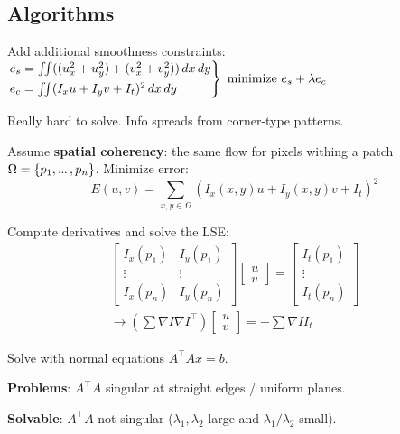 \subsection{Algorithms}

\begin{algorithm}
  Add additional smoothness constraints:
  \(\begin{rcases*}
    e_s = \iint ((u_x^2 + u_y^2) + (v_x^2 + v_y^2)) \,dx \,dy \\
    e_c = \iint (I_x u + I_yv +I_t)^2 \,dx \,dy
  \end{rcases*} \ \text{minimize} \ e_s + \lambda e_c \)

  Really hard to solve. Info spreads from corner-type patterns.
\end{algorithm}

\begin{algorithm}
  Assume \textbf{spatial coherency}: the same flow for pixels withing a patch \(\Omega = \{p_1, \sdots , p_n\}\). Minimize error:
  \[E(u, v) = \sum_{x, y \in \Omega} (I_x(x, y) u + I_y(x, y) v + I_t)^2\]
  
  Compute derivatives and solve the LSE:
  \begin{gather*}
    \begin{bmatrix}
    I_x(p_1) & I_y(p_1) \\ \vdots & \vdots \\ I_x(p_n) & I_y(p_n)
  \end{bmatrix} \begin{bmatrix}
    u \\ v
  \end{bmatrix} =  \begin{bmatrix}
    I_t(p_1) \\ \vdots \\ I_t(p_n)
  \end{bmatrix} \\
  \to (\sum \nabla I \nabla I^\top)\begin{bmatrix}
    u \\ v
  \end{bmatrix} = - \sum \nabla I I_t
  \end{gather*}

  Solve with normal equations \(A^\top A x = b\).

  \textbf{Problems}: \(A^\top A\) singular at straight edges / uniform planes.

  \textbf{Solvable}: \(A^\top A\) not singular (\(\lambda_1, \lambda_2\) large and \(\lambda_1 / \lambda_2\) small).
\end{algorithm}

